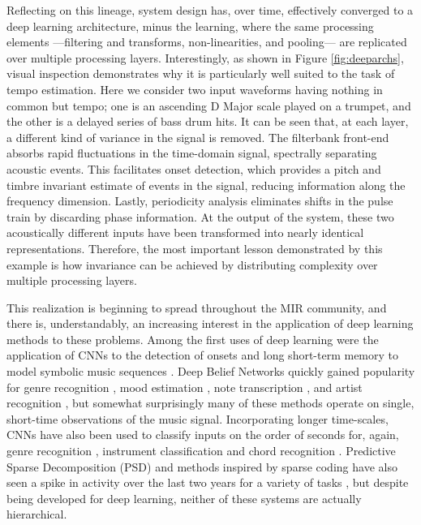 Reflecting on this lineage, system design has, over time, effectively converged to a deep learning architecture, minus the learning, where the same processing elements ---filtering and transforms, non-linearities, and pooling--- are replicated over multiple processing layers.
Interestingly, as shown in Figure \ref{fig:deeparchs}, visual inspection demonstrates why it is particularly well suited to the task of tempo estimation.
Here we consider two input waveforms having nothing in common but tempo; one is an ascending D Major scale played on a trumpet, and the other is a delayed series of bass drum hits.
It can be seen that, at each layer, a different kind of variance in the signal is removed.
The filterbank front-end absorbs rapid fluctuations in the time-domain signal, spectrally separating acoustic events.
This facilitates onset detection, which provides a pitch and timbre invariant estimate of events in the signal, reducing information along the frequency dimension.
Lastly, periodicity analysis eliminates shifts in the pulse train by discarding phase information.
At the output of the system, these two acoustically different inputs have been transformed into nearly identical representations.
Therefore, the most important lesson demonstrated by this example is how invariance can be achieved by distributing complexity over multiple processing layers.

This realization is beginning to spread throughout the MIR community, and there is, understandably, an increasing interest in the application of deep learning methods to these problems.
Among the first uses of deep learning were the application of CNNs to the detection of onsets \cite{Lacoste2007} and long short-term memory to model symbolic music sequences \cite{Eck2008}.
Deep Belief Networks quickly gained popularity for genre recognition \cite{Hamel2009}, mood estimation \cite{Schmidt2011}, note transcription \cite{Nam2011}, and artist recognition \cite{Dieleman2011}, but somewhat surprisingly many of these methods operate on single, short-time observations of the music signal.
Incorporating longer time-scales, CNNs have also been used to classify inputs on the order of seconds for, again, genre recognition \cite{Li2010}, instrument classification \cite{Humphrey2010} and chord recognition \cite{Humphrey2011, Humphrey2012b}.
Predictive Sparse Decomposition (PSD) and methods inspired by sparse coding have also seen a spike in activity over the last two years for a variety of tasks \cite{Henaff2011, Nam2012}, but despite being developed for deep learning, neither of these systems are actually hierarchical.

